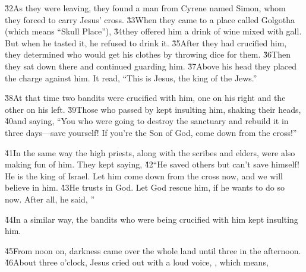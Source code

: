 \v{32}As they were leaving, they found a man from Cyrene named Simon, whom they forced to carry Jesus' cross. \v{33}When they came to a place called Golgotha (which means ``Skull Place''), \v{34}they offered him a drink of wine mixed with gall. But when he tasted it, he refused to drink it. \v{35}After they had crucified him, they determined who would get his clothes by throwing dice for them. \v{36}Then they sat down there and continued guarding him. \v{37}Above his head they placed the charge against him. It read, ``This is Jesus, the king of the Jews.''

\v{38}At that time two bandits were crucified with him, one on his right and the other on his left. \v{39}Those who passed by kept insulting him, shaking their heads, \v{40}and saying, ``You who were going to destroy the sanctuary and rebuild it in three days---save yourself! If you're the Son of God, come down from the cross!''

\v{41}In the same way the high priests, along with the scribes and elders, were also making fun of him. They kept saying, \v{42}``He saved others but can't save himself! He is the king of Israel. Let him come down from the cross now, and we will believe in him. \v{43}He trusts in God. Let God rescue him, if he wants to do so now. After all, he said, ''

\v{44}In a similar way, the bandits who were being crucified with him kept insulting him.

\v{45}From noon on, darkness came over the whole land until three in the afternoon. \v{46}About three o'clock, Jesus cried out with a loud voice, , which means, 


